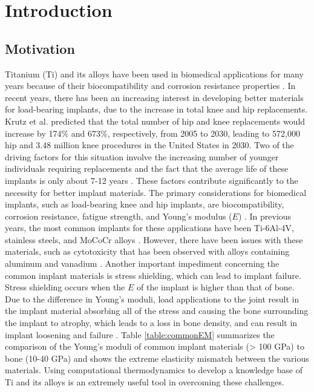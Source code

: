 \chapter{Introduction} \label{chapter1:introduction}

\section{\sloppy Motivation}
Titanium (Ti) and its alloys have been used in biomedical applications for many years because of their biocompatibility and corrosion resistance properties \cite{Long1998a}. In recent years, there has been an increasing interest in developing better materials for load-bearing implants, due to the increase in total knee and hip replacements. Krutz et al. \cite{Kurtz2007} predicted that the total number of hip and knee replacements would increase by 174\% and 673\%, respectively, from 2005 to 2030, leading to 572,000 hip and 3.48 million knee procedures in the United States in 2030. Two of the driving factors for this situation involve the increasing number of younger individuals requiring replacements and the fact that the average life of these implants is only about 7-12 years \cite{Krishna2007a}. These factors contribute significantly to the necessity for better implant materials. The primary considerations for biomedical implants, such as load-bearing knee and hip implants, are biocompatibility, corrosion resistance, fatigue strength, and Young's modulus ($E$) \cite{Long1998a}. In previous years, the most common implants for these applications have been Ti-6Al-4V, stainless steels, and MoCoCr alloys \cite{Niinomi2003,Niinomi2012}. However, there have been issues with these materials, such as cytotoxicity that has been observed with alloys containing aluminum and vanadium \cite{Ito1995a}. Another important impediment concerning the common implant materials is stress shielding, which can lead to implant failure. Stress shielding occurs when the $E$ of the implant is higher than that of bone. Due to the difference in Young's moduli, load applications to the joint result in the implant material absorbing all of the stress and causing the bone surrounding the implant to atrophy, which leads to a loss in bone density, and can result in implant loosening and failure \cite{Long1998a}.  Table \ref{table:commonEM} summarizes the comparison of the Young's moduli of common implant materials (> 100 GPa) to bone (10-40 GPa) \cite{Long1998a} and shows the extreme elasticity mismatch between the various materials. Using computational thermodynamics to develop a knowledge base of Ti and its alloys is an extremely useful tool in overcoming these challenges.


